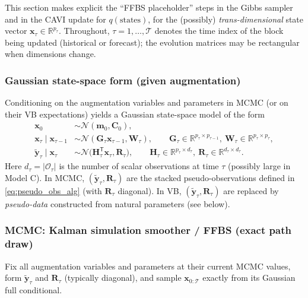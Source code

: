 \documentclass[11pt]{article}
\newcommand{\R}{\mathbb{R}}
\newcommand{\1}{\mathbb{I}}
\newcommand{\N}{\mathcal{N}}
\newcommand{\T}{\mathsf{T}}
\begin{document}
This section makes explicit the ``FFBS placeholder'' steps in the Gibbs sampler and in the CAVI update for
$q(\text{states})$, for the (possibly) \emph{trans-dimensional} state vector $\bm x_\tau\in\R^{p_\tau}$.
Throughout, $\tau=1,\dots,\mathcal{T}$ denotes the time index of the block being updated (historical or forecast);
the evolution matrices may be rectangular when dimensions change.

\subsubsection*{Gaussian state-space form (given augmentation)}
Conditioning on the augmentation variables and parameters in MCMC (or on their VB expectations) yields a Gaussian
state-space model of the form
\begin{align}
\bm x_0 &\sim \N(\bm m_0,\bm C_0), \label{eq:ssm_prior_generic}\\
\bm x_\tau \mid \bm x_{\tau-1} &\sim \N(\bm G_\tau \bm x_{\tau-1},\bm W_\tau),
\qquad \bm G_\tau\in\R^{p_\tau\times p_{\tau-1}},\ \bm W_\tau\in\R^{p_\tau\times p_\tau}, \label{eq:ssm_state_generic}\\
\tilde{\bm y}_\tau \mid \bm x_\tau &\sim \N\!\big(\bm H_\tau^\T \bm x_\tau,\bm R_\tau\big),
\qquad \bm H_\tau\in\R^{p_\tau\times d_\tau},\ \bm R_\tau\in\R^{d_\tau\times d_\tau}. \label{eq:ssm_obs_generic}
\end{align}
Here $d_\tau=|\mathcal{O}_\tau|$ is the number of scalar observations at time $\tau$ (possibly large in Model C).
In MCMC, $(\tilde{\bm y}_\tau,\bm R_\tau)$ are the stacked pseudo-observations defined in
\eqref{eq:pseudo_obs_alg} (with $\bm R_\tau$ diagonal).
In VB, $(\tilde{\bm y}_\tau,\bm R_\tau)$ are replaced by \emph{pseudo-data} constructed from natural parameters
(see below).

\subsubsection*{MCMC: Kalman simulation smoother / FFBS (exact path draw)}
Fix all augmentation variables and parameters at their current MCMC values, form $\tilde{\bm y}_\tau$ and $\bm R_\tau$
(typically diagonal), and sample $\bm x_{0:\mathcal{T}}$ exactly from its Gaussian full conditional.
\end{document}

